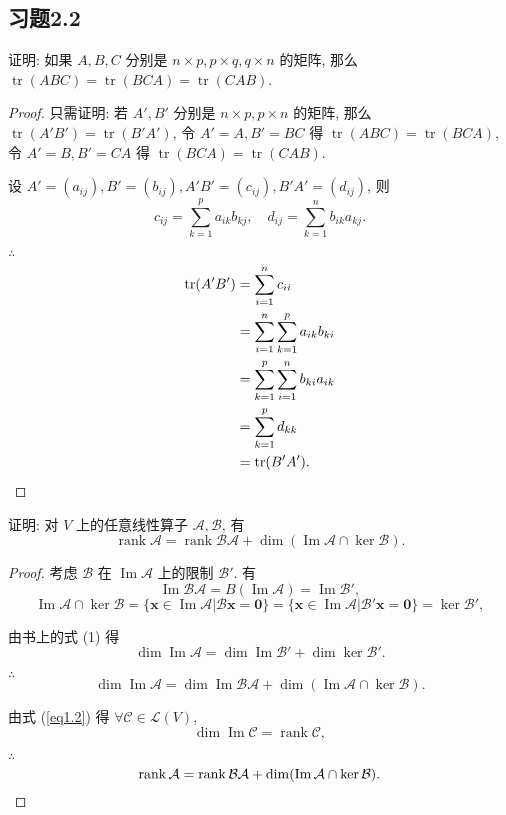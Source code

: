\documentclass{ctexart}
\begin{document}
\subsection{习题2.2}
\begin{exercise}%
    证明: 如果 $A,B,C$ 分别是 $n\times p,p\times q,q\times n$ 的矩阵, 那么 $\operatorname{tr}(ABC)=\operatorname{tr}(BCA)=\operatorname{tr}(CAB)$.
\end{exercise}
\begin{proof}
    只需证明: 若 $A',B'$ 分别是 $n\times p,p\times n$ 的矩阵, 那么 $\operatorname{tr}(A'B')=\operatorname{tr}(B'A')$, 令 $A'=A,B'=BC$ 得 $\operatorname{tr}(ABC)=\operatorname{tr}(BCA)$, 令 $A'=B,B'=CA$ 得 $\operatorname{tr}(BCA)=\operatorname{tr}(CAB)$.

    设 $A'=(a_{ij}),B'=(b_{ij}),A'B'=(c_{ij}),B'A'=(d_{ij})$, 则
    \[c_{ij}=\sum\limits_{k=1}^pa_{ik}b_{kj},\quad d_{ij}=\sum\limits_{k=1}^nb_{ik}a_{kj}.\]

    $\therefore$
    \begin{align*}
        \operatorname{tr}(A'B') & =\sum\limits_{i=1}^nc_{ii} \\
        & =\sum\limits_{i=1}^n\sum\limits_{k=1}^pa_{ik}b_{ki} \\
        & =\sum\limits_{k=1}^p\sum\limits_{i=1}^nb_{ki}a_{ik} \\
        & =\sum\limits_{k=1}^pd_{kk} \\
        & =\operatorname{tr}(B'A').\qedhere
    \end{align*}
\end{proof}
\addtocounter{exercise}{2}
\begin{exercise}\label{ex2.5}
    证明: 对 $V$ 上的任意线性算子 $\mathcal{A},\mathcal{B}$, 有
    \[\operatorname{rank}\mathcal{A}=\operatorname{rank}\mathcal{BA}+\dim(\operatorname{Im}\mathcal{A}\cap\ker\mathcal{B}).\]
\end{exercise}
\begin{proof}
    考虑 $\mathcal{B}$ 在 $\operatorname{Im}\mathcal{A}$ 上的限制 $\mathcal{B}'$. 有
    \[\operatorname{Im}\mathcal{BA}=B(\operatorname{Im}\mathcal{A})=\operatorname{Im}\mathcal{B}',\]
    \[\operatorname{Im}\mathcal{A}\cap\ker\mathcal{B}=\{\boldsymbol{x}\in\operatorname{Im}\mathcal{A}|\mathcal{B}\boldsymbol{x}=\boldsymbol{0}\}=\{\boldsymbol{x}\in\operatorname{Im}\mathcal{A}|\mathcal{B}'\boldsymbol{x}=\boldsymbol{0}\}=\ker\mathcal{B}',\]

    由书上的式 (1) 得
    \[\dim\operatorname{Im}\mathcal{A}=\dim\operatorname{Im}\mathcal{B}'+\dim\ker\mathcal{B}'.\]

    $\therefore$
    \[\dim\operatorname{Im}\mathcal{A}=\dim\operatorname{Im}\mathcal{BA}+\dim(\operatorname{Im}\mathcal{A}\cap\ker\mathcal{B}).\]

    由式 (\ref{eq1.2}) 得 $\forall\mathcal{C}\in\mathcal{L}(V)$,
    \[\dim\operatorname{Im}\mathcal{C}=\operatorname{rank}\mathcal{C},\]

    $\therefore$
    \[\operatorname{rank}\mathcal{A}=\operatorname{rank}\mathcal{BA}+\dim(\operatorname{Im}\mathcal{A}\cap\ker\mathcal{B}).\qedhere\]
\end{proof}
\end{document}
